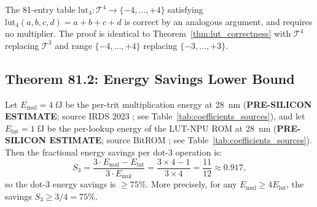 \begin{corollary}
\label{cor:4input_extension}
The 81-entry table $\mathrm{lut}_4 : \mathcal{T}^4 \to \{-4,\ldots,+4\}$
satisfying $\mathrm{lut}_4(a,b,c,d) = a+b+c+d$ is correct by an analogous
argument, and requires no multiplier.  The proof is identical to
Theorem~\ref{thm:lut_correctness} with $\mathcal{T}^4$ replacing $\mathcal{T}^3$
and range $\{-4,\ldots,+4\}$ replacing $\{-3,\ldots,+3\}$.
\end{corollary}

\subsection{Theorem 81.2: Energy Savings Lower Bound}

\begin{theorem}
\label{thm:energy_savings}
Let $E_{\mathrm{mul}} = 4\;\mathrm{fJ}$ be the per-trit multiplication
energy at 28~nm (\textbf{PRE-SILICON ESTIMATE}; source IRDS 2023
\cite{irds2023}; see Table~\ref{tab:coefficients_sources}), and let
$E_{\mathrm{lut}} = 1\;\mathrm{fJ}$ be the per-lookup energy of the
LUT-NPU ROM at 28~nm (\textbf{PRE-SILICON ESTIMATE}; source BitROM
\cite{bitrom_2025}; see Table~\ref{tab:coefficients_sources}).  Then
the fractional energy savings per dot-3 operation is:
\[
  S_3 = \frac{3 \cdot E_{\mathrm{mul}} - E_{\mathrm{lut}}}
             {3 \cdot E_{\mathrm{mul}}}
      = \frac{3 \times 4 - 1}{3 \times 4}
      = \frac{11}{12} \approx 0.917,
\]
so the dot-3 energy savings is $\geq 75\%$.  More precisely, for any
$E_{\mathrm{mul}} \geq 4E_{\mathrm{lut}}$, the savings $S_3 \geq 3/4 = 75\%$.
\end{theorem}

